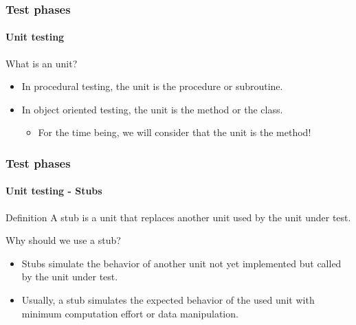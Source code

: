 \begin{frame}
\frametitle{Test phases}
\framesubtitle{Unit testing}

\begin{block:fact}{What is an unit?}
\begin{itemize}
	\item In procedural testing, the unit is the procedure or subroutine.

	\item In object oriented testing, the unit is the method or the class.
	\begin{itemize}
		\item For the time being, we will consider that the unit is the method!
	\end{itemize}
\end{itemize}
\end{block:fact}
\end{frame}


\begin{frame}
\label{concept:stub}
\frametitle{Test phases}
\framesubtitle{Unit testing - Stubs}

\begin{block:concept}{Definition}
A stub is a unit that replaces another unit used by the unit under test.
\end{block:concept}

\begin{block:fact}{Why should we use a stub?}
\begin{itemize}
	\item Stubs simulate the behavior of another unit not yet implemented but
	called by the unit under test.

	\item Usually, a stub simulates the expected behavior of the used unit with
	minimum computation effort or data manipulation.
\end{itemize}
\end{block:fact}
\end{frame}


